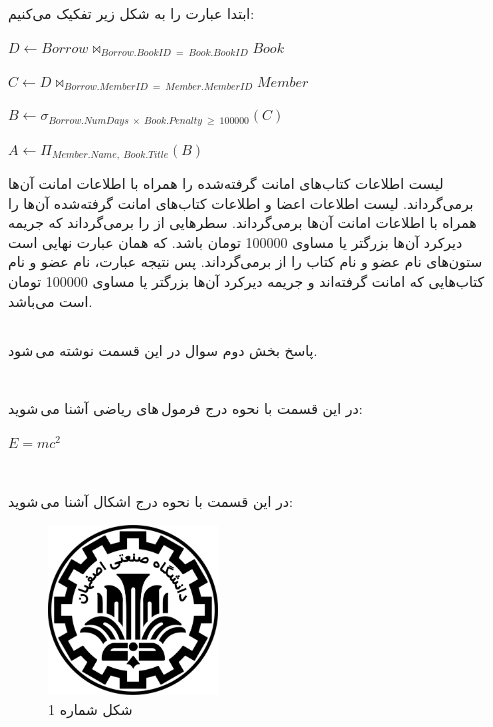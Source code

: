 \documentclass{article}
\begin{document}
\subsection{}
ابتدا عبارت را به شکل زیر تفکیک می‌کنیم:
\begin{center}
$
D
\leftarrow
Borrow
\bowtie_{Borrow.BookID\:=\:Book.BookID}
Book
$
\end{center}
\begin{center}
$
C
\leftarrow
D
\bowtie_{Borrow.MemberID\:=\:Member.MemberID}
Member
$
\end{center}
\begin{center}
$
B
\leftarrow
\sigma_{Borrow.NumDays\:\times\:Book.Penalty\:\geq\:100000}
(C)
$
\end{center}
\begin{center}
$
A
\leftarrow
\Pi_{Member.Name,\:Book.Title}
(B)
$
\end{center}
لیست اطلاعات کتاب‌های امانت گرفته‌شده را همراه با اطلاعات امانت آن‌ها برمی‌گرداند.
\newline
{}
لیست اطلاعات اعضا و اطلاعات کتاب‌های امانت گرفته‌شده آن‌ها را همراه با اطلاعات امانت آن‌ها برمی‌گرداند.
\newline
{}
سطر‌هایی از
را برمی‌گرداند که جریمه دیرکرد آن‌ها بزرگتر یا مساوی 100000 تومان باشد. 
\newline
{}
که همان عبارت نهایی است ستون‌های نام عضو و نام کتاب را از
برمی‌گرداند.
\newline
پس نتیجه عبارت، نام عضو و نام کتاب‌هایی که امانت گرفته‌اند و جریمه دیرکرد آن‌ها بزرگتر یا مساوی 100000 تومان است می‌باشد.
\subsection{}
پاسخ بخش دوم سوال در این قسمت نوشته می\,شود.

\section{}
در این قسمت با نحوه درج فرمول\,های ریاضی آشنا می\,شوید:
\begin{center}
$E = m{c}^{2}$
\end{center}

\section{}
در این قسمت با نحوه درج اشکال آشنا می\,شوید:
\begin{figure}[ht]
    \centering
    \includegraphics[width=0.4\textwidth]{figures/IUT Logo.png}
    \caption{شکل شماره 1}
    \label{fig:fig1}
\end{figure}
\end{document}
